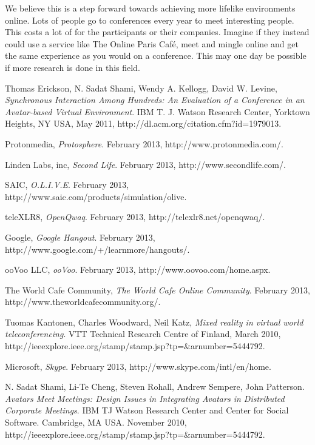 \documentclass[12pt, titlepage]{article}
\begin{document}
We believe this is a step forward towards achieving more lifelike environments online. Lots of people go to conferences every year to meet interesting people. This costs a lot of for the participants or their companies. Imagine if they instead could use a service like The Online Paris Café, meet and mingle online and get the same experience as you would on a conference. This may one day be possible if more research is done in this field.
\begin{thebibliography}{9}

  Thomas Erickson, N. Sadat Shami, Wendy A. Kellogg, David W. Levine,
  \emph{Synchronous Interaction Among Hundreds: An Evaluation of a Conference in an Avatar-based Virtual Environment}.
 IBM T. J. Watson Research Center, Yorktown Heights, NY USA,
  May 2011,
  http://dl.acm.org/citation.cfm?id=1979013.


  Protonmedia,
  \emph{Protosphere}.
  February 2013,
  http://www.protonmedia.com/.

  Linden Labs, inc,
  \emph{Second Life}.
  February 2013,
  http://www.secondlife.com/.

  SAIC,
  \emph{O.L.I.V.E}.
  February 2013,
  http://www.saic.com/products/simulation/olive.

  teleXLR8,
  \emph{OpenQwaq}.
  February 2013,
  http://telexlr8.net/openqwaq/.
  
  Google,
  \emph{Google Hangout}.
  February 2013,
  http://www.google.com/+/learnmore/hangouts/.
  
  ooVoo LLC,
  \emph{ooVoo}.
  February 2013,
  http://www.oovoo.com/home.aspx.
  
  The World Cafe Community,
  \emph{The World Cafe Online Community}.
  February 2013,
  http://www.theworldcafecommunity.org/. 

  Tuomas Kantonen, Charles Woodward, Neil Katz,
  \emph{Mixed reality in virtual world teleconferencing}.
  VTT Technical Research Centre of Finland,
  March 2010,
  http://ieeexplore.ieee.org/stamp/stamp.jsp?tp=\&arnumber=5444792.

  Microsoft,
  \emph{Skype}.
  February 2013,
  http://www.skype.com/intl/en/home. 

  N. Sadat Shami, Li-Te Cheng, Steven Rohall, Andrew Sempere, John Patterson. 
  \emph{Avatars Meet Meetings: Design Issues in Integrating Avatars in Distributed Corporate Meetings}.
  IBM TJ Watson Research Center and Center for Social Software.
  Cambridge, MA USA.
  November 2010,
  http://ieeexplore.ieee.org/stamp/stamp.jsp?tp=\&arnumber=5444792.
 

\end{thebibliography}
\end{document}
